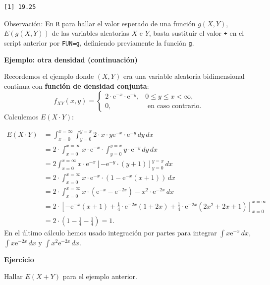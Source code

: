 \documentclass[
  letterpaper,
  DIV=11,
  numbers=noendperiod]{scrreprt}
\begin{document}
\begin{verbatim}
[1] 19.25
\end{verbatim}

Observación: En \texttt{R} para hallar el valor esperado de una función
\(g(X,Y)\), \(E(g(X,Y))\) de las variables aleatorias \(X\) e \(Y\),
basta sustituir el valor \texttt{+} en el script anterior por
\texttt{FUN=g}, definiendo previamente la función \texttt{g}.

\textbf{Ejemplo: otra densidad (continuación)}

Recordemos el ejemplo donde \((X,Y)\) era una variable aleatoria
bidimensional continua con \textbf{función de densidad conjunta}: \[
f_{XY}(x,y)=\begin{cases}
2\cdot \mathrm{e}^{-x}\cdot\mathrm{e}^{-y}, & 0\leq y\leq x < \infty,\\
0, & \mbox{ en caso contrario.}
\end{cases}
\] Calculemos \(E(X\cdot Y)\):

\[
\begin{array}{rl}
E(X\cdot Y) & =\displaystyle \int_{x=0}^{x=\infty} \int_{y=0}^{y=x} 2\cdot x\cdot y \mathrm{e}^{-x}\cdot\mathrm{e}^{-y}\, dy\, dx\\
& =\displaystyle  2\cdot\int_{x=0}^{x=\infty} x \cdot\mathrm{e}^{-x} \cdot\int_{y=0}^{y=x}  y \cdot\mathrm{e}^{-y}\, dy\, dx\\
& =\displaystyle  2\int_{x=0}^{x=\infty}x\cdot \mathrm{e}^{-x} \left[-\mathrm{e}^{-y}\cdot (y+1)\right]_{y=0}^{y=x}\, dx\\
& =\displaystyle  2\cdot\int_{x=0}^{x=\infty}x \cdot\mathrm{e}^{-x} \cdot\left(1-\mathrm{e}^{-x}(x+1)\right)\, dx \\ 
&= \displaystyle 2\cdot\int_{x=0}^{x=\infty}x\cdot\left( \mathrm{e}^{-x}-\mathrm{e}^{-2x}\right)-x^2\cdot\mathrm{e}^{-2x}\, dx \\ 
& =\displaystyle  2\cdot\left[-\mathrm{e}^{-x}(x+1)+\frac{1}{4}\cdot\mathrm{e}^{-2 x}(1+2x)+\frac{1}{4} \cdot\mathrm{e}^{-2 x} \left(2 x^2+2
   x+1\right)\right]_{x=0}^{x=\infty} \\
   &= \displaystyle 2\cdot \left(1-\frac{1}{4}-\frac{1}{4}\right)=1.
\end{array}
\] En el último cálculo hemos usado integración por partes para integrar
\(\int x\mathrm{e}^{-x}\,dx\), \(\int x\mathrm{e}^{-2x}\,dx\) y
\(\int x^2\mathrm{e}^{-2x}\, dx\).

\textbf{Ejercicio}

Hallar \(E(X+Y)\) para el ejemplo anterior.
\end{document}

